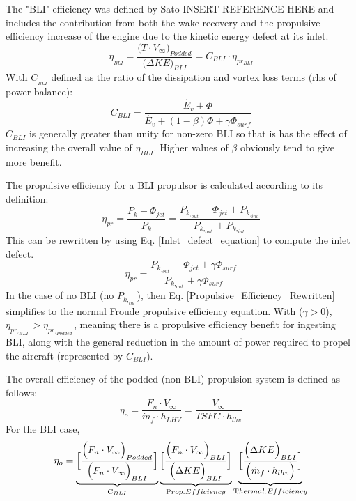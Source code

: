 					The "BLI" efficiency was defined by Sato INSERT REFERENCE HERE and includes the contribution from both the wake recovery and the propulsive efficiency increase of the engine due to the kinetic energy defect at its inlet.					
					\begin{equation}
						\eta_{_{BLI}} = \frac{\Big(T \cdot V_\infty\Big)_{Podded}}{\Big(\Delta KE\Big)_{BLI}} = C_{BLI} \cdot \eta_{pr_{BLI}}
						\label{eta_BLI}
					\end{equation}
					With $C_{_{BLI}}$ defined as the ratio of the dissipation and vortex loss terms (rhs of power balance):
					\begin{equation}
						C_{BLI} = \frac{\dot{E_v}+\Phi}{\dot{E_v} + (1-\beta)\Phi + \gamma \Phi_{surf}}
					\end{equation}
					$C_{BLI}$ is generally greater than unity for non-zero BLI so that is has the effect of increasing the overall value of $\eta_{BLI}$.  Higher values of $\beta$ obviously tend to give more benefit.  
					
					The propulsive efficiency for a BLI propulsor is calculated according to its definition:
					\begin{equation}
						\eta_{pr} = \frac{P_k - \Phi_{jet}}{P_k} = \frac{P_{k,_{out}} - \Phi_{jet} + P_{k,_{inl}}}{P_{k,_{out}} + P_{k,_{inl}}}
						\label{Propulsive_Efficiency}
					\end{equation}
					This can be rewritten by using Eq. \ref{Inlet_defect_equation} to compute the inlet defect.  
					\begin{equation}
						\eta_{pr} = \frac{P_{k,_{out}} - \Phi_{jet} + \gamma \Phi_{surf}}{P_{k,_{out}} +\gamma \Phi_{surf}}
						\label{Propulsive_Efficiency_Rewritten}
					\end{equation}
					In the case of no BLI (no $P_{k,_{inl}}$), then Eq. \ref{Propulsive_Efficiency_Rewritten} simplifies to the normal Froude propulsive efficiency equation.  With ($\gamma > 0$), $\eta_{pr,_{BLI}} > \eta_{pr,_{Podded}}$, meaning there is a propulsive efficiency benefit for ingesting BLI, along with the general reduction in the amount of power required to propel the aircraft (represented by $C_{BLI}$).  
					
					The overall efficiency of the podded (non-BLI) propulsion system is defined as follows:
					\begin{equation} 
						\eta_o = \frac{F_n \cdot V_\infty}{\dot{m}_f \cdot h_{LHV}} = \frac{V_\infty}{TSFC \cdot h_{lhv}}
						\label{Overall_Efficiency}
					\end{equation}	
					For the BLI case, 
					\begin{equation}
						\eta_o = \underbrace{\Big[\frac{\Big(F_n \cdot V_\infty\Big)_{Podded}}{\Big(F_n \cdot V_\infty\Big)_{BLI}}\Big]}_{\text C_{BLI}}
								 \underbrace{\Big[\frac{\Big(F_n \cdot V_\infty\Big)_{BLI}}{\Big(\Delta KE\Big)_{BLI}}\Big]}_{\text Prop. Efficiency}
						         \underbrace{\Big[\frac{\Big(\Delta KE\Big)_{BLI}}{\Big(\dot{m}_f \cdot h_{lhv}\Big)}\Big]}_{\text Thermal. Efficiency}								 
					\end{equation}									
					
